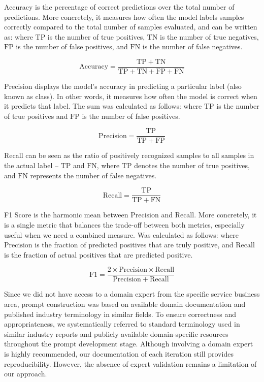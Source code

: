 \medskip
Accuracy is the percentage of correct predictions over the total number of  predictions. More concretely, it measures how often the model labels samples  correctly compared to the total number of samples evaluated, and can be written  as: where $\mathrm{TP}$ is the number of true positives, $\mathrm{TN}$ is the  number of true negatives, $\mathrm{FP}$ is the number of false positives,  and $\mathrm{FN}$ is the number of false negatives.

$$
\mathrm{Accuracy} = \frac{\mathrm{TP} + \mathrm{TN}}
{\mathrm{TP} + \mathrm{TN} + \mathrm{FP} + \mathrm{FN}}
$$

\medskip
Precision displays the model’s accuracy in predicting a particular label (also known as class).  In other words, it measures how often the model is correct when it predicts that label. The sum was calculated as follows: where $\mathrm{TP}$ is the number of true positives and $\mathrm{FP}$ is the number of false positives.

$$
\mathrm{Precision} 
= \frac{\mathrm{TP}}{\mathrm{TP} + \mathrm{FP}}
$$

\medskip
Recall can be seen as the ratio of positively recognized samples to all samples  in the actual label -- $\mathrm{TP}$ and $\mathrm{FN}$, where $\mathrm{TP}$ denotes the number of true positives, and $\mathrm{FN}$ represents the number of false negatives.

$$
\mathrm{Recall} = \frac{\mathrm{TP}}{\mathrm{TP} + \mathrm{FN}}
$$

\medskip
F1 Score is the harmonic mean between Precision and Recall. More concretely, it is a single metric  that balances the trade-off between both metrics, especially useful when we need a combined measure.  Was calculated as follows: where $\mathrm{Precision}$ is the fraction of predicted positives that are  truly positive, and $\mathrm{Recall}$ is the fraction of actual positives that are predicted positive.

$$
\mathrm{F1} = \frac{2 \times \mathrm{Precision} \times \mathrm{Recall}}
{\mathrm{Precision} + \mathrm{Recall}}
$$




Since we did not have access to a domain expert from the specific service business area, prompt construction was based on available domain documentation and published industry terminology in similar fields. To ensure correctness and appropriateness, we systematically referred to standard terminology used in similar industry reports and publicly available domain-specific resources throughout the prompt development stage. Although involving a domain expert is highly recommended, our documentation of each iteration still provides reproducibility. However, the absence of expert validation remains a limitation of our approach.